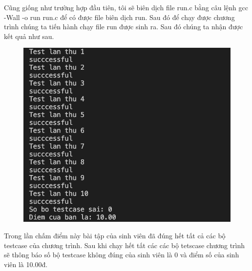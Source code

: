 \documentclass[12pt,a4paper]{article}
\begin{document}
Cũng giống như trường hợp đầu tiên, tôi sẽ biên dịch file run.c bằng câu lệnh gcc -Wall -o run run.c để có được file biên dịch run. Sau đó để chạy được chương trình chúng ta tiến hành chạy file run được sinh ra. Sau đó chúng ta nhận được kết quả như sau.

\begin{figure}[ht]
\begin{center}
\includegraphics[scale=.3]{hinhanh/ketquademoarraydung.png}
\end{center}
\end{figure}

Trong lần chấm điểm này bài tập của sinh viên đã đúng hết tất cả các bộ testcase của chương trình. Sau khi chạy hết tất các các bộ tetscase chương trình sẽ thông báo số bộ testcase không đúng của sinh viên là 0 và điểm số của sinh viên là 10.00đ.



\end{document}
